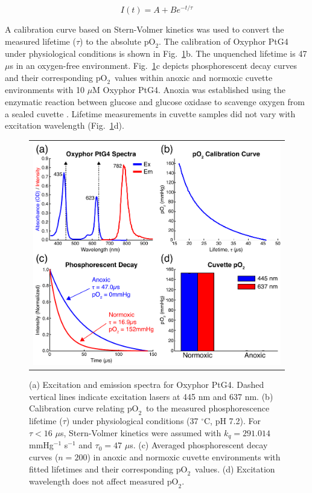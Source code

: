 \documentclass[12pt]{spieman}  %
\newcommand{\pO}{\ensuremath{\text{pO}_2}} 	            %
\begin{document}
\begin{spacing}{2}
\begin{equation}
    \label{eq:phosphorescence}
    I(t) = A + Be^{-t / \tau}
\end{equation}

A calibration curve based on Stern-Volmer kinetics \cite{Vanderkooi:1986hs,Wilson:2003ek} was used to convert the measured lifetime ($\tau$) to the absolute \pO. The calibration of Oxyphor PtG4 under physiological conditions is shown in Fig.~\ref{fig:oxyphor_ptg4}b. The unquenched lifetime is 47 $\mu$s in an oxygen-free environment. Fig.~\ref{fig:oxyphor_ptg4}c depicts phosphorescent decay curves and their corresponding \pO\ values within anoxic and normoxic cuvette environments with 10 $\mu$M Oxyphor PtG4. Anoxia was established using the enzymatic reaction between glucose and glucose oxidase to scavenge oxygen from a sealed cuvette \cite{Lo:1997he}. Lifetime measurements in cuvette samples did not vary with excitation wavelength (Fig.~\ref{fig:oxyphor_ptg4}d).

\begin{figure}
    \begin{center}
        \begin{tabular}{c}
            \includegraphics[width=6.25in]{Figure2.pdf}
        \end{tabular}
    \end{center}
    \caption {
        \label{fig:oxyphor_ptg4}
        (a) Excitation and emission spectra for Oxyphor PtG4. Dashed vertical lines indicate excitation lasers at 445 nm and 637 nm. (b) Calibration curve relating \pO\ to the measured phosphorescence lifetime ($\tau$) under physiological conditions (37 $^\circ$C, pH 7.2). For $\tau < 16$ $\mu$s, Stern-Volmer kinetics were assumed with $k_q = 291.014$ mmHg$^{-1}$ s$^{-1}$ and $\tau_0 = 47$ $\mu$s. (c) Averaged phosphorescent decay curves ($n = 200$) in anoxic and normoxic cuvette environments with fitted lifetimes and their corresponding \pO\ values. (d) Excitation wavelength does not affect measured \pO.
    }
\end{figure}


\end{spacing}
\end{document}
